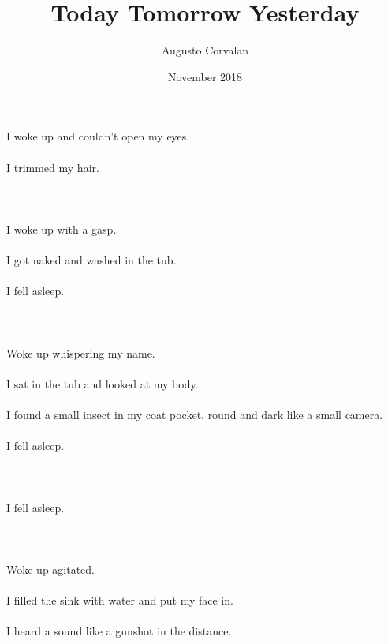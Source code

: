 \documentclass{article}
\title{Today Tomorrow Yesterday}
\date{November 2018}
\author{Augusto Corvalan}
\begin{document}
    
    \section{}
    I woke up and couldn't open my eyes.\\\\I trimmed my hair.\\\\ 
    \newpage
    
    \section{}
    I woke up with a gasp.\\\\I got naked and washed in the tub.\\\\I fell asleep.\\\\ 
    \newpage
    
    \section{}
    Woke up whispering my name.\\\\I sat in the tub and looked at my body.\\\\I found a small insect in my coat pocket, round and dark like a small camera.\\\\I fell asleep.\\\\ 
    \newpage
    
    \section{}
    I fell asleep.\\\\ 
    \newpage
    
    \section{}
    Woke up agitated.\\\\I filled the sink with water and put my face in.\\\\I heard a sound like a gunshot in the distance.\\\\ 
    \newpage
    
\end{document}
